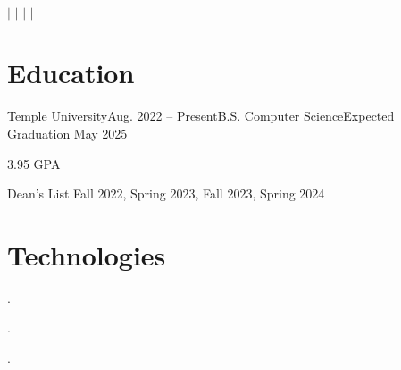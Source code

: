 \documentclass[letterpaper,11pt]{article}
\begin{document}
{\Huge \myname}
\\
\vspace{2pt}

\small{
    \faEnvelope
    \thinspace \thinspace
    \myemail
    \thinspace \thinspace $|$
    \faGithub
    \thinspace \thinspace
    \mygh
    \thinspace \thinspace $|$
    \faLinkedin
    \thinspace \thinspace
    \mylinkedin
    \thinspace \thinspace $|$
    \faPhone
    \thinspace \thinspace
    \myphone
    \thinspace \thinspace $|$
    \thinspace \thinspace
    \mylocation
}

\vspace{-7pt}

\section{Education}
\begin{entries}
    \item\begin{experience}{Temple University}{Aug. 2022 -- Present}{B.S. Computer Science}{Expected Graduation May 2025}
        \item 3.95 GPA
        \item Dean's List Fall 2022, Spring 2023, Fall 2023, Spring 2024
    \end{experience}
\end{entries}

\section{Technologies}
\begin{description}[nosep, labelindent=0.15in]
    \item[Programming Languages:] \myprogramminglanguages.
    \item[Libraries:] \mylibraries.
    \item[Tools:] \mytools.
\end{description}
\end{document}
